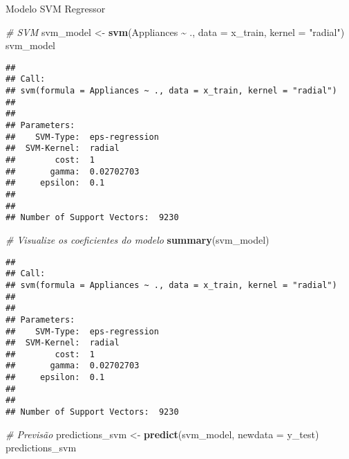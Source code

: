 \documentclass[
]{article}
\newenvironment{Shaded}{\begin{snugshade}}{\end{snugshade}}
\newcommand{\AttributeTok}[1]{\textcolor[rgb]{0.13,0.29,0.53}{#1}}
\newcommand{\CommentTok}[1]{\textcolor[rgb]{0.56,0.35,0.01}{\textit{#1}}}
\newcommand{\FunctionTok}[1]{\textcolor[rgb]{0.13,0.29,0.53}{\textbf{#1}}}
\newcommand{\NormalTok}[1]{#1}
\newcommand{\OtherTok}[1]{\textcolor[rgb]{0.56,0.35,0.01}{#1}}
\newcommand{\SpecialCharTok}[1]{\textcolor[rgb]{0.81,0.36,0.00}{\textbf{#1}}}
\newcommand{\StringTok}[1]{\textcolor[rgb]{0.31,0.60,0.02}{#1}}
\begin{document}
Modelo SVM Regressor

\begin{Shaded}
\begin{Highlighting}[]
\CommentTok{\# SVM}
\NormalTok{svm\_model }\OtherTok{\textless{}{-}} \FunctionTok{svm}\NormalTok{(Appliances }\SpecialCharTok{\textasciitilde{}}\NormalTok{ ., }\AttributeTok{data =}\NormalTok{ x\_train, }\AttributeTok{kernel =} \StringTok{"radial"}\NormalTok{)}
\NormalTok{svm\_model}
\end{Highlighting}
\end{Shaded}

\begin{verbatim}
## 
## Call:
## svm(formula = Appliances ~ ., data = x_train, kernel = "radial")
## 
## 
## Parameters:
##    SVM-Type:  eps-regression 
##  SVM-Kernel:  radial 
##        cost:  1 
##       gamma:  0.02702703 
##     epsilon:  0.1 
## 
## 
## Number of Support Vectors:  9230
\end{verbatim}

\begin{Shaded}
\begin{Highlighting}[]
\CommentTok{\# Visualize os coeficientes do modelo}
\FunctionTok{summary}\NormalTok{(svm\_model)}
\end{Highlighting}
\end{Shaded}

\begin{verbatim}
## 
## Call:
## svm(formula = Appliances ~ ., data = x_train, kernel = "radial")
## 
## 
## Parameters:
##    SVM-Type:  eps-regression 
##  SVM-Kernel:  radial 
##        cost:  1 
##       gamma:  0.02702703 
##     epsilon:  0.1 
## 
## 
## Number of Support Vectors:  9230
\end{verbatim}

\begin{Shaded}
\begin{Highlighting}[]
\CommentTok{\# Previsão}
\NormalTok{predictions\_svm }\OtherTok{\textless{}{-}} \FunctionTok{predict}\NormalTok{(svm\_model, }\AttributeTok{newdata =}\NormalTok{ y\_test)}
\NormalTok{predictions\_svm}
\end{Highlighting}
\end{Shaded}
\end{document}
